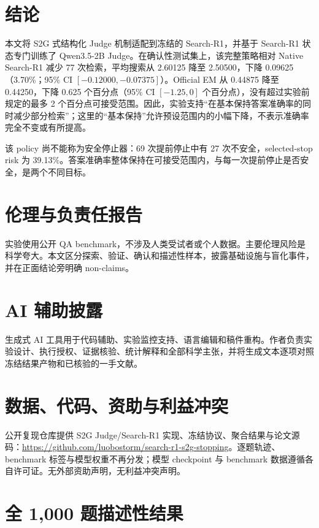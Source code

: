 \documentclass[UTF8,fontset=fandol,11pt,a4paper]{ctexart}
\begin{document}
\section{结论}

本文将 S2G 式结构化 Judge 机制适配到冻结的 Search-R1，并基于 Search-R1 状态专门训练了 Qwen3.5-2B Judge。在确认性测试集上，该完整策略相对 Native Search-R1 减少 77 次检索，平均搜索从 2.60125 降至 2.50500，下降 0.09625（3.70\%；95\% CI $[-0.12000,-0.07375]$）。Official EM 从 0.44875 降至 0.44250，下降 0.625 个百分点（95\% CI $[-1.25,0]$ 个百分点），没有超过实验前规定的最多 2 个百分点可接受范围。因此，实验支持“在基本保持答案准确率的同时减少部分检索”；这里的“基本保持”允许预设范围内的小幅下降，不表示准确率完全不变或有所提高。

该 policy 尚不能称为安全停止器：69 次提前停止中有 27 次不安全，selected-stop risk 为 39.13\%。答案准确率整体保持在可接受范围内，与每一次提前停止是否安全，是两个不同目标。

\section*{伦理与负责任报告}

实验使用公开 QA benchmark，不涉及人类受试者或个人数据。主要伦理风险是科学夸大。本文区分探索、验证、确认和描述性样本，披露基础设施与盲化事件，并在正面结论旁明确 non-claims。

\section*{AI 辅助披露}

生成式 AI 工具用于代码辅助、实验监控支持、语言编辑和稿件重构。作者负责实验设计、执行授权、证据核验、统计解释和全部科学主张，并将生成文本逐项对照冻结结果产物和已核验的一手文献。

\section*{数据、代码、资助与利益冲突}

公开复现仓库提供 S2G Judge/Search-R1 实现、冻结协议、聚合结果与论文源码：\url{https://github.com/luobostorm/search-r1-s2g-stopping}。逐题轨迹、benchmark 标签与模型权重不再分发；模型 checkpoint 与 benchmark 数据遵循各自许可证。无外部资助声明，无利益冲突声明。




\appendix
\section{全 1,000 题描述性结果}
\end{document}
